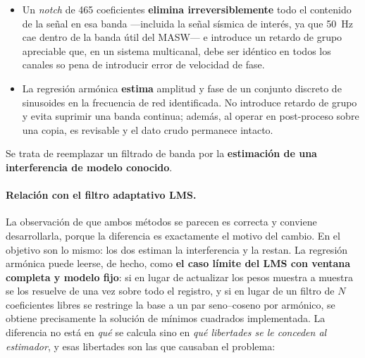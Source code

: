 \begin{itemize}[itemsep=0.2em]
    \item Un \emph{notch} de 465 coeficientes \textbf{elimina irreversiblemente} todo el
    contenido de la se\~nal en esa banda ---incluida la se\~nal s\'ismica de inter\'es, ya que
    \SI{50}{\hertz} cae dentro de la banda \'util del MASW--- e introduce un retardo de
    grupo apreciable que, en un sistema multicanal, debe ser id\'entico en todos los
    canales so pena de introducir error de velocidad de fase.
    \item La regresi\'on arm\'onica \textbf{estima} amplitud y fase de un conjunto discreto
    de sinusoides en la frecuencia de red identificada. No introduce retardo de grupo y
    evita suprimir una banda continua; adem\'as, al operar en post-proceso sobre una copia,
    es revisable y el dato crudo permanece intacto.
\end{itemize}

Se trata de reemplazar un filtrado de banda por la \textbf{estimaci\'on de una
interferencia de modelo conocido}.

\paragraph{Relaci\'on con el filtro adaptativo LMS.} La observaci\'on de que ambos
m\'etodos se parecen es correcta y conviene desarrollarla, porque la diferencia es
exactamente el motivo del cambio. En el objetivo son lo mismo: los dos estiman la
interferencia y la restan. La regresi\'on arm\'onica puede leerse, de hecho, como
\textbf{el caso l\'imite del LMS con ventana completa y modelo fijo}: si en lugar de
actualizar los pesos muestra a muestra se los resuelve de una vez sobre todo el registro,
y si en lugar de un filtro de $N$ coeficientes libres se restringe la base a un par
seno--coseno por arm\'onico, se obtiene precisamente la soluci\'on de m\'inimos cuadrados
implementada. La diferencia no est\'a en \emph{qu\'e} se calcula sino en \emph{qu\'e
libertades se le conceden al estimador}, y esas libertades son las que causaban el
problema:

